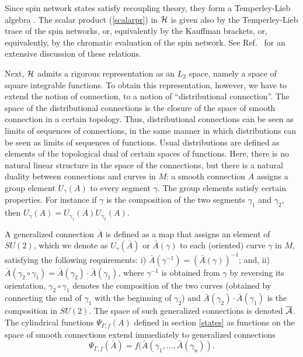\documentclass[12pt]{article}
\begin{document}
Since spin network states satisfy recoupling theory, they form a 
Temperley-Lieb algebra \cite{Kauffman94}.  The scalar product 
(\ref{scalarpr}) in $\cal H$ is given also by the Temperley-Lieb 
trace of the spin networks, or, equivalently by the Kauffman 
brackets, or, equivalently, by the chromatic evaluation of the 
spin network.  See Ref.~\cite{DePietriRovelli} for an extensive 
discussion of these relations. 

Next, $\cal H$ admits a rigorous representation as an $L_{2}$ 
space, namely a space of square integrable functions.  To obtain 
this representation, however, we have to extend the notion of 
connection, to a notion of ``distributional connection''.  The 
space of the distributional connections is the closure of the 
space of smooth connection in a certain topology.  Thus, 
distributional connections can be seen as limits of sequences of 
connections, in the same manner in which distributions can be 
seen as limits of sequences of functions.  Usual distributions 
are defined as elements of the topological dual of certain spaces 
of functions.  Here, there is no natural linear structure in the 
space of the connections, but there is a natural duality between 
connections and curves in $M$: a smooth connection $A$ assigns a 
group element $U_{\gamma}(A)$ to every segment $\gamma$.  The 
group elements satisfy certain properties.  For instance if  
$\gamma$ is the composition of the two segments $\gamma_{1}$ and 
$\gamma_{2}$, then $U_{\gamma}(A) = U_{\gamma_{1}}(A) 
U_{\gamma_{2}}(A)$. 

A generalized connection $\bar{A}$ is defined as a map that 
assigns an element of $SU(2)$, which we denote as 
$U_{\gamma}(\bar{A})$ or $\bar{A}(\gamma)$ to each (oriented) 
curve $\gamma$ in $M$, satisfying the following requirements: i) 
$\bar{A}(\gamma^{-1}) = (\bar{A}(\gamma))^{-1}$; and, ii) 
$\bar{A}(\gamma_2\circ \gamma_1) = \bar{A}(\gamma_2)\cdot 
\bar{A}(\gamma_1)$, where $\gamma^{-1}$ is obtained from $\gamma$ 
by reversing its orientation, $\gamma_2\circ \gamma_1$ denotes 
the composition of the two curves (obtained by connecting the end 
of $\gamma_1$ with the beginning of $\gamma_2$) and 
$\bar{A}(\gamma_2)\cdot\bar{A}(\gamma_1)$ is the composition in 
$SU(2)$.  The space of such generalized connections is denoted 
$\overline{\cal A}$. The cylindrical functions $\Psi_{\Gamma, f}(A)$ 
defined in section \ref{states} as functions on the space of smooth 
connections extend immediately to generalized connections
\begin{equation}
	\Psi_{\Gamma,f}(\bar A)=f(\bar A(\gamma_{1},\ldots,\bar 
	A(\gamma_{n})).
\end{equation}
\end{document}
